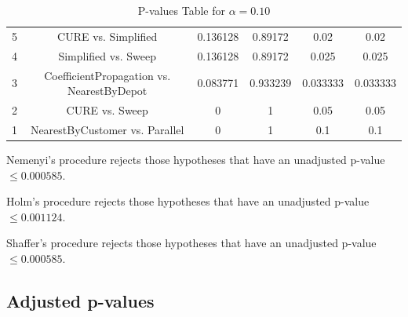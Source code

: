\documentclass[a4paper,10pt]{article}
\begin{document}
\begin{landscape}
\begin{table}[!htp]
\begin{tabular}{cccccc}
5&CURE vs. Simplified&0.136128&0.89172&0.02&0.02\\
4&Simplified vs. Sweep&0.136128&0.89172&0.025&0.025\\
3&CoefficientPropagation vs. NearestByDepot&0.083771&0.933239&0.033333&0.033333\\
2&CURE vs. Sweep&0&1&0.05&0.05\\
1&NearestByCustomer vs. Parallel&0&1&0.1&0.1\\
\hline
\end{tabular}
\caption{P-values Table for $\alpha=0.10$}
\end{table}Nemenyi's procedure rejects those hypotheses that have an unadjusted p-value $\le0.000585$.

Holm's procedure rejects those hypotheses that have an unadjusted p-value $\le0.001124$.

Shaffer's procedure rejects those hypotheses that have an unadjusted p-value $\le0.000585$.

\pagebreak

\subsection{Adjusted p-values}


\end{landscape}
\end{document}
